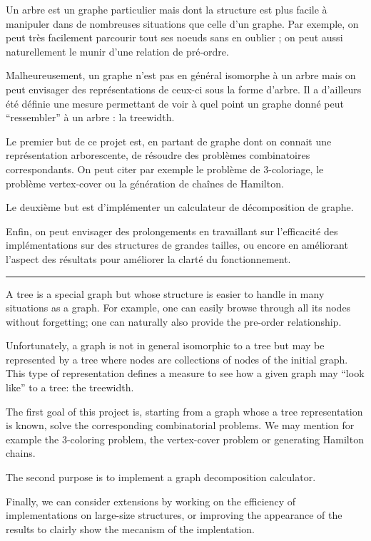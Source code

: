 \documentclass[a4paper, 10pt,french]{article}
\begin{document}
Un arbre est un graphe particulier mais dont la structure est plus facile à manipuler dans de nombreuses situations que celle d'un graphe. Par exemple, on peut très facilement parcourir tout ses noeuds sans en oublier ; on peut aussi naturellement le  munir d'une relation de pré-ordre.

Malheureusement, un graphe n'est pas en général isomorphe à un arbre mais on peut envisager des représentations de ceux-ci sous la forme d'arbre. Il a d'ailleurs été définie une mesure permettant de voir à quel point un graphe donné peut ``ressembler'' à un arbre : la treewidth.

Le premier but de ce projet est, en partant de graphe dont on connait une représentation arborescente, de résoudre des problèmes combinatoires correspondants. On peut citer par exemple le problème de 3-coloriage, le problème vertex-cover ou la génération de chaînes de Hamilton.

Le deuxième but est d'implémenter un calculateur de décomposition de graphe.

Enfin, on peut envisager des prolongements en travaillant sur l'efficacité des implémentations sur des structures de grandes tailles, ou encore en améliorant l'aspect des résultats pour améliorer la clarté du fonctionnement.


\bigskip

\hrule

\bigskip


A tree is a special graph but whose structure is easier to handle in many situations as a graph. For example, one can easily browse through all its nodes without forgetting; one can naturally also provide the pre-order relationship.

Unfortunately, a graph is not in general isomorphic to a tree but may be represented by a tree where nodes are collections of nodes of the initial graph.  This type of representation defines a measure to see how a given graph may ``look like''  to a tree: the treewidth.

The first goal of this project is, starting from a graph whose a tree representation is known, solve the corresponding combinatorial problems. We may mention for example the 3-coloring problem, the vertex-cover problem or generating Hamilton chains.

The second purpose is to implement a graph decomposition calculator.

Finally, we can consider extensions by working on the efficiency of implementations on large-size structures, or improving the appearance of the results to clairly show the mecanism  of the  implentation.
\end{document}

